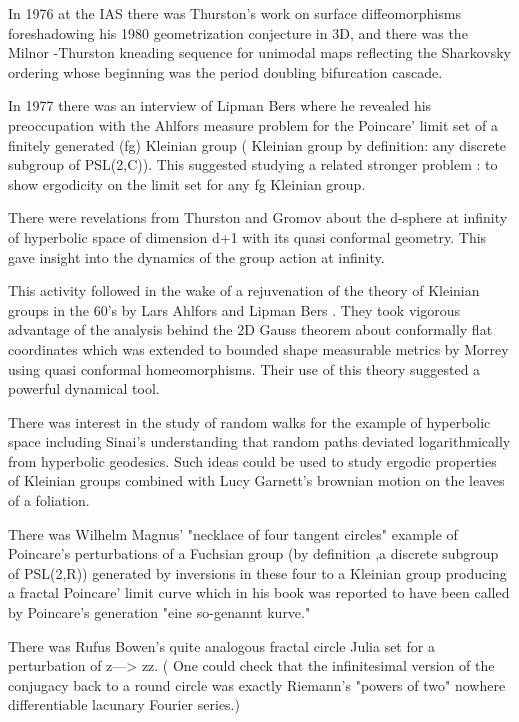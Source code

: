 \begin{description}
  In 1976 at the IAS  there was Thurston's work on surface diffeomorphisms   foreshadowing  his 1980 geometrization conjecture in 3D, and  there was the Milnor -Thurston kneading sequence for unimodal maps reflecting the Sharkovsky ordering whose beginning  was the  period doubling bifurcation
cascade.

  In 1977 there  was an interview of Lipman Bers where he  revealed his preoccupation with the Ahlfors measure problem for the  Poincare' limit set of a finitely generated (fg)  Kleinian group ( Kleinian group by definition: any discrete subgroup of PSL(2,C)). This suggested  studying  a related  stronger problem : to show ergodicity on the limit set for any fg  Kleinian group.

  There  were revelations  from Thurston and Gromov  about the d-sphere at infinity of hyperbolic space of dimension d+1 with its quasi conformal geometry. This gave insight into the dynamics of the group action  at infinity.

  This activity followed  in the wake of  a rejuvenation of the theory of Kleinian groups in the 60's by  Lars Ahlfors and Lipman Bers .
 They took vigorous advantage of the analysis behind the 2D  Gauss theorem about conformally flat coordinates  which was extended to  bounded shape measurable metrics by Morrey using quasi conformal  homeomorphisms.
Their use of this theory  suggested a powerful dynamical tool.

 There was  interest in the  study of random walks for the example of hyperbolic space  including Sinai's understanding that random paths deviated logarithmically  from hyperbolic geodesics.  Such ideas  could be used  to  study  ergodic properties of Kleinian groups  combined with Lucy Garnett's brownian motion on the leaves of a foliation.

 There was  Wilhelm Magnus'  "necklace of  four tangent circles" example of Poincare's perturbations of a Fuchsian group (by definition ,a discrete subgroup of PSL(2,R)) generated by inversions in  these four to a Kleinian group  producing a fractal Poincare'  limit curve  which in his book was reported to have been called by Poincare's generation "eine so-genannt  kurve."

 There was   Rufus Bowen's quite  analogous  fractal circle Julia set for a perturbation of z---> zz.  ( One could check that the  infinitesimal  version of the conjugacy back  to a round circle was  exactly Riemann's  "powers of two" nowhere differentiable lacunary   Fourier series.)


\end{description}
